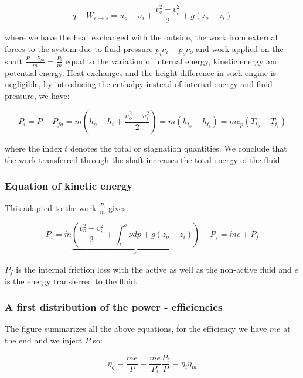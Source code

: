\begin{equation}
q + W_{e\rightarrow s} = u_o - u_i + \frac{v_o ^2 - v_i^2}{2} + g(z_o - z_i)
\end{equation}

where we have the heat exchanged with the outside, the work from external forces to the system due to fluid pressure $p_i \nu _i - p_o\nu_o$ and work applied on the shaft $\frac{P - P_{fa}}{\dot{m}} =  \frac{P_i}{\dot{m}}$ equal to the variation of internal energy, kinetic energy and potential energy. Heat exchanges and the height difference in such engine is negligible, by introducing the enthalpy instead of internal energy and fluid pressure, we have: 

\begin{equation}
P_i = P - P_{fa} = \dot{m}\left( h_o - h_i + \frac{v_o^2 - v_i^2}{2} \right) = \dot{m} (h_{t_o} - h_{t_i}) = \dot{m} c_p (T_{t_o} - T_{t_i})
\end{equation}

where the index $t$ denotes the total or stagnation quantities. We conclude that the work transferred through the shaft increases the total energy of the fluid. 

\subsubsection{Equation of kinetic energy}
This adapted to the work $\frac{P_i}{\dot{m}}$ gives: 

\begin{equation}
P_i = \dot{m} \underbrace{\left( \frac{v_o^2-v_i^2}{2} + \int _{i}^{o} \nu dp + g(z_o - z_i)\right)}_{e} + P_f = \dot{m} e + P_f
\end{equation}

$P_f$ is the internal friction loss with the active as well as the non-active fluid and $e$ is the energy transferred to the fluid. 

\subsubsection{A first distribution of the power - efficiencies}
The figure summarizes all the above equations, for the efficiency we have $\dot{m}e$ at the end and we inject $P$ so: 

\begin{equation}
\eta _{g} = \frac{\dot{m}e}{P} = \frac{\dot{m}e}{P_i} \frac{P_i}{P} = \eta _i \eta _m
\end{equation}

